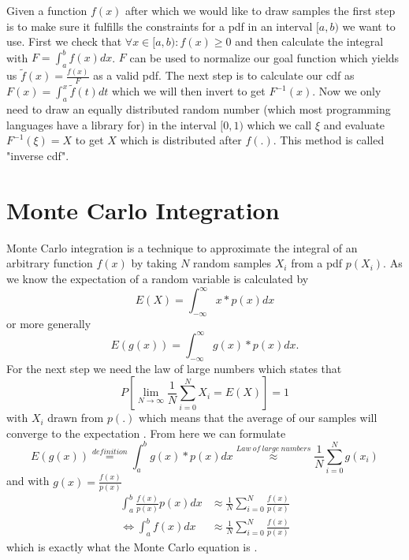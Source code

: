 Given a function $ f(x) $ after which we would like to draw samples the first step is to make sure it fulfills the constraints for a pdf in an interval $ [a, b) $ we want to use.
First we check that $ \forall x \in [a, b): f(x) \geq 0 $ and then calculate the integral with $ F = \int_{a}^b f(x) dx $.
$ F $ can be used to normalize our goal function which yields us $ \tilde{f}(x) = \frac{f(x)}{F} $ as a valid pdf.
The next step is to calculate our cdf as $ F(x) = \int_{a}^x \tilde{f}(t) dt $ which we will then invert to get $ F^{-1}(x) $.
Now we only need to draw an equally distributed random number (which most programming languages have a library for) in the interval $ [0, 1) $
which we call $ \xi $ and evaluate $ F^{-1}(\xi) = X $ to get $ X $ which is distributed after $ f(.) $.
This method is called "inverse cdf". \cite{pris}

\section{Monte Carlo Integration}
\label{sec:monte_carlo}

Monte Carlo integration is a technique to approximate the integral of an arbitrary function $ f(x) $
by taking $ N $ random samples $ X_i $ from a pdf $ p(X_i) $.
As we know the expectation of a random variable is calculated by $$ E(X) = \int_{-\infty}^\infty x * p(x) dx $$
or more generally $$ E(g(x)) = \int_{-\infty}^\infty g(x) * p(x) dx. $$
For the next step we need the law of large numbers which states that $$ P\left[ \lim_{N\to\infty} \frac{1}{N} \sum_{i = 0}^N X_i = E(X) \right] = 1 $$
with $ X_i $ drawn from $ p(.) $ which means that the average of our samples will converge to the expectation \cite[Chapter~2.4.1]{veach-thesis}.
From here we can formulate
\begin{equation*}
    E(g(x)) \stackrel{definition}{=} \int_{a}^b g(x) * p(x) dx
    \stackrel{Law~of~large~numbers}{\approx} \frac{1}{N} \sum_{i = 0}^N g(x_i)
\end{equation*}
and with $ g(x) = \frac{f(x)}{p(x)} $
\begin{equation*}
\begin{aligned}
    \int_{a}^b \frac{f(x)}{p(x)} p(x) dx &\approx \frac{1}{N} \sum_{i = 0}^N \frac{f(x)}{p(x)} \\
    \Leftrightarrow \int_{a}^b f(x) dx &\approx \frac{1}{N} \sum_{i = 0}^N \frac{f(x)}{p(x)}
\end{aligned}
\end{equation*}
which is exactly what the Monte Carlo equation is \cite{pris}.

